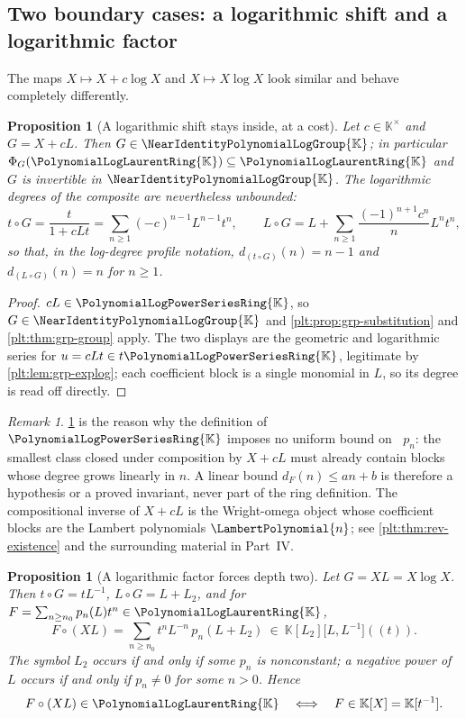 \documentclass[11pt,oneside]{article}
\theoremstyle{plain}
\newtheorem{proposition}[theorem]{Proposition}
\theoremstyle{definition}
\theoremstyle{remark}
\newtheorem{remark}[theorem]{Remark}
\newcommand{\K}{\mathbb{K}}
\newcommand{\PLpow}{\PolynomialLogPowerSeriesRing{\K}}   %
\newcommand{\PLlau}{\PolynomialLogLaurentRing{\K}}       %
\newcommand{\Gnear}{\NearIdentityPolynomialLogGroup{\K}} %
\DeclareMathOperator{\degL}{deg_{L}}
\newcommand{\compose}{\mathbin{\circ}}
\newcommand{\LamP}[1]{\LambertPolynomial{#1}}
\newcommand{\dprofile}[1]{d_{#1}}                        %
\begin{document}
\subsection{Two boundary cases: a logarithmic shift and a logarithmic factor}

The maps \(X\mapsto X+c\log X\) and \(X\mapsto X\log X\) look similar and
behave completely differently.

\begin{proposition}[A logarithmic shift stays inside, at a cost]
\label{plt:prop:grp-logdegree}
Let \(c\in\K^{\times}\) and \(G=X+cL\).  Then \(G\in\Gnear\); in particular
\(\Phi_G(\PLlau)\subseteq\PLlau\) and \(G\) is invertible in \(\Gnear\).  The
logarithmic degrees of the composite are nevertheless unbounded:
\[
  t\compose G=\frac{t}{1+cLt}=\sum_{n\ge1}(-c)^{n-1}L^{n-1}t^{n},
  \qquad
  L\compose G=L+\sum_{n\ge1}\frac{(-1)^{n+1}c^{n}}{n}L^{n}t^{n},
\]
so that, in the log-degree profile notation,
\(\dprofile{(t\compose G)}(n)=n-1\) and \(\dprofile{(L\compose G)}(n)=n\) for
\(n\ge1\).
\end{proposition}

\begin{proof}
\(cL\in\PLpow\), so \(G\in\Gnear\) and \cref{plt:prop:grp-substitution} and
\cref{plt:thm:grp-group} apply.  The two displays are the geometric and
logarithmic series for \(u=cLt\in t\PLpow\), legitimate by
\cref{plt:lem:grp-explog}; each coefficient block is a single monomial in
\(L\), so its degree is read off directly.
\end{proof}

\begin{remark}
\cref{plt:prop:grp-logdegree} is the reason why the definition of \(\PLpow\)
imposes no uniform bound on \(\degL p_n\): the smallest class closed under
composition by \(X+cL\) must already contain blocks whose degree grows linearly
in \(n\).  A linear bound \(\dprofile{F}(n)\le an+b\) is therefore a hypothesis
or a proved invariant, never part of the ring definition.  The compositional
inverse of \(X+cL\) is the Wright-omega object whose coefficient blocks are the
Lambert polynomials \(\LamP{n}\); see \cref{plt:thm:rev-existence} and
the surrounding material in Part~IV.
\end{remark}

\begin{proposition}[A logarithmic factor forces depth two]
\label{plt:prop:grp-xlogx}
Let \(G=XL=X\log X\).  Then \(t\compose G=tL^{-1}\), \(L\compose G=L+L_2\), and
for \(F=\sum_{n\ge n_0}p_n(L)t^n\in\PLlau\),
\begin{equation}\label{plt:eq:grp-xlogx}
  F\compose(XL)=\sum_{n\ge n_0}t^{n}L^{-n}\,p_n(L+L_2)
  \ \in\ \K[L_2]\bigl[L,L^{-1}\bigr]((t)).
\end{equation}
The symbol \(L_2\) occurs if and only if some \(p_n\) is nonconstant; a
negative power of \(L\) occurs if and only if \(p_n\ne0\) for some \(n>0\).
Hence
\[
  F\compose(XL)\in\PLlau
  \quad\Longleftrightarrow\quad
  F\in\K[X]=\K[t^{-1}].
\]
\end{proposition}
\end{document}
